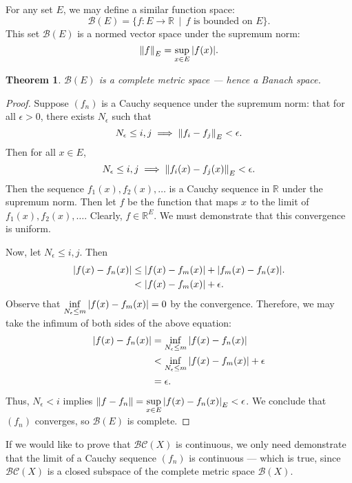 \documentclass[11pt]{article}
\newtheorem{theorem}{Theorem}
\begin{document}
For any set $E$, we may define a similar function space:
\[
	\mathcal{B}(E) = \{ f : E \to \mathbb{R} \, \mid \, f \text{ is bounded on $E$}\}.
\]
This set $\mathcal{B}(E)$ is a normed vector space under the supremum norm:
\[
	\norm{f}_{E} = \sup\limits_{x \in E} \abs{f(x)}.
\]
\begin{theorem}
	$\mathcal{B}(E)$ is a complete metric space --- hence a Banach space.
\end{theorem}
\begin{adjustwidth}{0.5cm}{}
	\begin{proof}
		Suppose $(f_{n})$ is a Cauchy sequence under the supremum norm: that for all $\epsilon > 0$, there exists $N_{\epsilon}$ such that
		\[
			N_{\epsilon} \le i, j \implies \norm{f_{i} - f_{j}}_{E} < \epsilon.
		\]
		Then for all $x \in E$,
		\[
			N_{\epsilon} \le i, j \implies \norm{f_{i}(x) - f_{j}(x)}_{E} < \epsilon.
		\]
		Then the sequence $f_{1}(x), f_{2}(x), \ldots$ is a Cauchy sequence in $\mathbb{R}$ under the supremum norm. Then let $f$ be the function that maps $x$ to the limit of $f_{1}(x), f_{2}(x), \ldots$. Clearly, $f \in \mathbb{R}^{E}$. We must demonstrate that this convergence is uniform.
		
		Now, let $N_{\epsilon} \le i, j$. Then
		\begin{align*}
			\abs{f(x) - f_{n}(x)} &\le \abs{f(x) - f_{m}(x)} + \abs{f_{m}(x) - f_{n}(x)}. \\
			&< \abs{f(x) - f_{m}(x)} + \epsilon.
		\end{align*}
		Observe that $\inf\limits_{N_{\epsilon} \le m} \abs{f(x) - f_{m}(x)} = 0$ by the convergence. Therefore, we may take the infimum of both sides of the above equation:
		\begin{align*}
			\abs{f(x) - f_{n}(x)} &= \inf\limits_{N_{\epsilon} \le m} \abs{f(x) - f_{n}(x)} \\
			&< \inf\limits_{N_{\epsilon} \le m} \abs{f(x) - f_{m}(x)} + \epsilon \\
			&= \epsilon.
		\end{align*}
		Thus, $N_{\epsilon} < i$ implies $\norm{f - f_{n}} = \sup\limits_{x \in E} \abs{f(x) - f_{n}(x)}_{E} < \epsilon$. We conclude that $(f_{n})$ converges, so $\mathcal{B}(E)$ is complete.
	\end{proof}
\end{adjustwidth}

If we would like to prove that $\mathcal{BC}(X)$ is continuous, we only need demonstrate that the limit of a Cauchy sequence $(f_{n})$ is continuous --- which is true, since $\mathcal{BC}(X)$ is a closed subspace of the complete metric space $\mathcal{B}(X)$.
\end{document}

